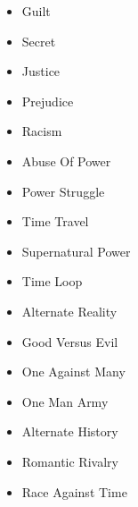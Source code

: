 \begin{minipage}[t]{.5\textwidth}
        \begin{itemize}
        \item Guilt
        \item Secret
        \item Justice
        \item Prejudice
        \item Racism
        \item Abuse Of Power
        \item Power Struggle
        \item Time Travel
        \item Supernatural Power
        \item Time Loop
        \item Alternate Reality
        \item Good Versus Evil
        \item One Against Many
        \item One Man Army
        \item Alternate History
        \item Romantic Rivalry
        \item Race Against Time
    \end{itemize}
\end{minipage}%
\pagebreak

